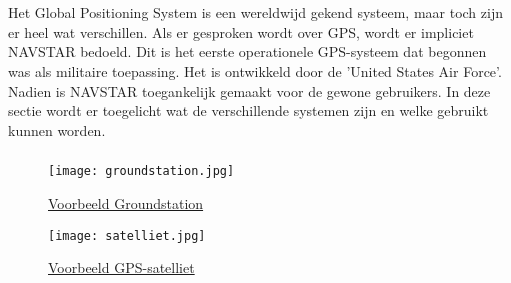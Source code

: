 \chapter{}
\label{ch:stand-van-zaken}


\section{}
Het Global Positioning System is een wereldwijd gekend systeem, maar toch zijn er heel wat verschillen. Als er gesproken wordt over GPS, wordt er impliciet NAVSTAR bedoeld. Dit is het eerste operationele GPS-systeem dat begonnen was als militaire toepassing. Het is ontwikkeld door de 'United States Air Force'. \autocite{gnss}  Nadien is NAVSTAR toegankelijk gemaakt voor de gewone gebruikers. In deze sectie wordt er toegelicht wat de verschillende systemen zijn en welke gebruikt kunnen worden.

\subsection{}
\begin{figure}
	\texttt{[image: groundstation.jpg]}
	\caption{\href{https://www.esa.int/About_Us/ESAC/Cebreros_ground_stationt}{Voorbeeld Groundstation}}
	\label{fig:groundstation}
\end{figure}
\begin{figure}
	\texttt{[image: satelliet.jpg]}
	\caption{\href{https://spacenews.com/40530gps-2f-6-navigation-satellite-slated-to-launch-on-may-15/}{Voorbeeld GPS-satelliet}}
	\label{fig:satelliet}
\end{figure}


